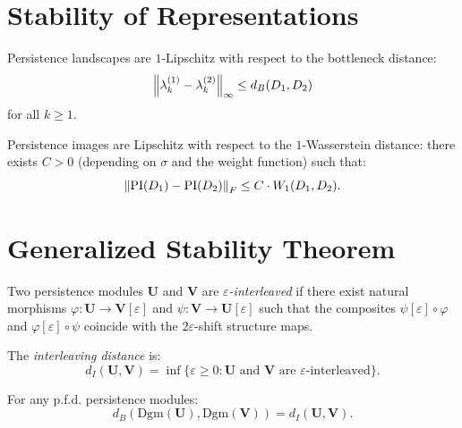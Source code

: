 \section{Stability of Representations}

\begin{theorem}
Persistence landscapes are $1$-Lipschitz with respect to the
bottleneck distance:
\[
  \left\| \lambda_k^{(1)} - \lambda_k^{(2)} \right\|_\infty
  \leq d_B(D_1, D_2)
\]
for all $k \geq 1$.
\end{theorem}

\begin{proposition}
Persistence images are Lipschitz with respect to the $1$-Wasserstein
distance: there exists $C > 0$ (depending on $\sigma$ and the weight
function) such that:
\[
  \left\| \mathrm{PI}(D_1) - \mathrm{PI}(D_2) \right\|_F
  \leq C \cdot W_1(D_1, D_2).
\]
\end{proposition}

\section{Generalized Stability Theorem}

\begin{definition}
Two persistence modules $\mathbf{U}$ and $\mathbf{V}$ are
\emph{$\varepsilon$-interleaved} if there exist natural morphisms
$\varphi : \mathbf{U} \to \mathbf{V}[\varepsilon]$ and
$\psi : \mathbf{V} \to \mathbf{U}[\varepsilon]$ such that the
composites $\psi[\varepsilon] \circ \varphi$ and
$\varphi[\varepsilon] \circ \psi$ coincide with the
$2\varepsilon$-shift structure maps.

The \emph{interleaving distance} is:
\[
  d_I(\mathbf{U}, \mathbf{V}) = \inf\{\varepsilon \geq 0 :
  \mathbf{U} \text{ and } \mathbf{V} \text{ are }
  \varepsilon\text{-interleaved}\}.
\]
\end{definition}

\begin{theorem}
For any p.f.d. persistence modules:
\[
  d_B(\mathrm{Dgm}(\mathbf{U}), \mathrm{Dgm}(\mathbf{V}))
  = d_I(\mathbf{U}, \mathbf{V}).
\]
\end{theorem}

